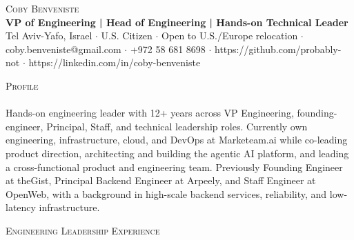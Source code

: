 \documentclass[a4paper]{article}
\newcommand{\lineunder} {
    \vspace*{-8pt} \\
    \hspace*{-18pt} \hrulefill \\
}
\newcommand{\header} [1] {
    {\hspace*{-18pt}\vspace*{6pt} \textsc{#1}}
    \vspace*{-6pt} \lineunder
}
\begin{document}
\vspace*{-40pt}

\vspace*{-10pt}
\begin{center}
	{\Huge \scshape {Coby Benveniste}}\\
	{\large \textbf{VP of Engineering | Head of Engineering | Hands-on Technical Leader}}\\
	{\small Tel Aviv-Yafo, Israel $\cdot$ U.S. Citizen $\cdot$ Open to U.S./Europe relocation $\cdot$ coby.benveniste@gmail.com $\cdot$ +972 58 681 8698 $\cdot$ https://github.com/probably-not $\cdot$ https://linkedin.com/in/coby-benveniste}\\
\end{center}

\header{Profile}
Hands-on engineering leader with 12+ years across VP Engineering, founding-engineer, Principal, Staff, and technical leadership roles. Currently own engineering, infrastructure, cloud, and DevOps at Marketeam.ai while co-leading product direction, architecting and building the agentic AI platform, and leading a cross-functional product and engineering team. Previously Founding Engineer at theGist, Principal Backend Engineer at Arpeely, and Staff Engineer at OpenWeb, with a background in high-scale backend services, reliability, and low-latency infrastructure.\\
\vspace{1mm}

\header{Engineering Leadership Experience}
\vspace{1mm}
\end{document}
